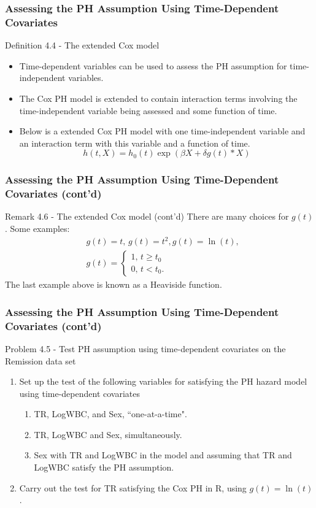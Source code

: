 \documentclass{beamer}
\theoremstyle{definition}
\begin{document}
\begin{frame}
\frametitle{Assessing the PH Assumption Using Time-Dependent Covariates}
\begin{block}{Definition 4.4 - The extended Cox model}
\begin{itemize}
\item Time-dependent variables can be used to assess the PH assumption for time-independent variables.
\item The Cox PH model is extended to contain interaction terms involving the time-independent variable being assessed and some function of time.
\item Below is a extended Cox PH model with one time-independent variable and an interaction term with this variable and a function of time.
\[
h(t,X) = h_0(t)\exp(\beta X + \delta g(t)* X)
\]
\end{itemize}
\end{block}
\end{frame}

\begin{frame}
\frametitle{Assessing the PH Assumption Using Time-Dependent Covariates (cont'd)}
\begin{block}{Remark 4.6 - The extended Cox model (cont'd)}
There are many choices for $g(t)$. Some examples:
\begin{align*}
& g(t) = t, \, g(t) = t^2, g(t)=\ln(t),  \\
& g(t) = \begin{cases}
1, \, t \ge t_0\\
0, \, t < t_0.
\end{cases}
\end{align*}
The last example above is known as a Heaviside function.
\end{block}
\end{frame}

\begin{frame}
\frametitle{Assessing the PH Assumption Using Time-Dependent Covariates (cont'd)}
\begin{block}{Problem 4.5 - Test PH assumption using time-dependent covariates on the Remission data set}
\begin{enumerate}
\item Set up the test of the following variables for satisfying the PH hazard model using time-dependent covariates
\begin{enumerate}
\item TR, LogWBC, and Sex, ``one-at-a-time".
\item TR, LogWBC and Sex, simultaneously.
\item Sex with TR and LogWBC in the model and assuming that TR and LogWBC satisfy the PH assumption.
\end{enumerate}
\item Carry out the test for TR satisfying the Cox PH in R, using $g(t) = \ln(t)$.
\end{enumerate}
\end{block}
\end{frame}
\end{document}
